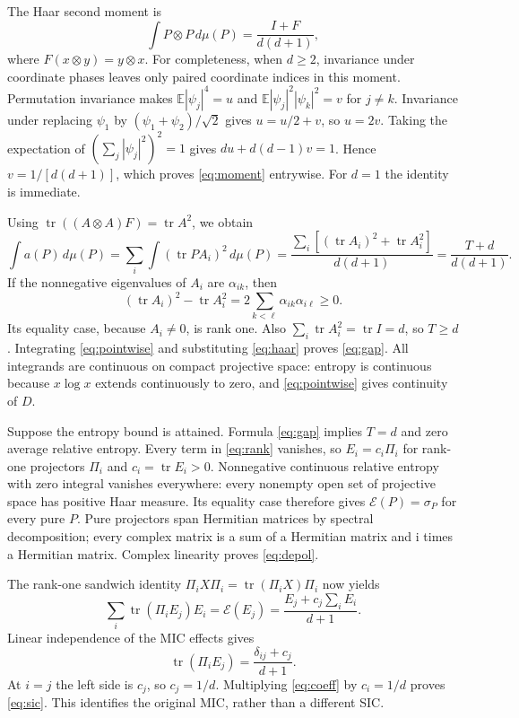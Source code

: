 \documentclass[11pt]{article}
\newcommand{\tr}{\operatorname{tr}}
\newcommand{\Id}{I}
\newcommand{\cE}{\mathcal E}
\begin{document}
The Haar second moment is
\begin{equation}\label{eq:moment}
 \int P\otimes P\,d\mu(P)=\frac{\Id+F}{d(d+1)},
\end{equation}
where $F(x\otimes y)=y\otimes x$.
For completeness, when $d\geq2$, invariance under coordinate phases
leaves only paired coordinate indices in this moment. Permutation
invariance makes $\mathbb E|\psi_j|^4=u$ and
$\mathbb E|\psi_j|^2|\psi_k|^2=v$ for $j\ne k$.
Invariance under replacing $\psi_1$ by $(\psi_1+\psi_2)/\sqrt2$
gives $u=u/2+v$, so $u=2v$. Taking the expectation of
$(\sum_j|\psi_j|^2)^2=1$ gives $du+d(d-1)v=1$.
Hence $v=1/[d(d+1)]$, which proves \eqref{eq:moment} entrywise.
For $d=1$ the identity is immediate.

Using $\tr((A\otimes A)F)=\tr A^2$, we obtain
\begin{equation}\label{eq:haar}
 \int a(P)\,d\mu(P)
 =\sum_i\int(\tr PA_i)^2\,d\mu(P)
 =\frac{\sum_i[(\tr A_i)^2+\tr A_i^2]}{d(d+1)}
 =\frac{T+d}{d(d+1)}.
\end{equation}
If the nonnegative eigenvalues of $A_i$ are $\alpha_{ik}$, then
\begin{equation}\label{eq:rank}
 (\tr A_i)^2-\tr A_i^2
   =2\sum_{k<\ell}\alpha_{ik}\alpha_{i\ell}\geq0.
\end{equation}
Its equality case, because $A_i\ne0$, is rank one.
Also $\sum_i\tr A_i^2=\tr\Id=d$, so $T\geq d$.
Integrating \eqref{eq:pointwise} and substituting \eqref{eq:haar}
proves \eqref{eq:gap}. All integrands are continuous on compact
projective space: entropy is continuous because $x\log x$ extends
continuously to zero, and \eqref{eq:pointwise} gives continuity of $D$.

Suppose the entropy bound is attained. Formula \eqref{eq:gap} implies
$T=d$ and zero average relative entropy. Every term in
\eqref{eq:rank} vanishes, so $E_i=c_i\Pi_i$ for rank-one projectors
$\Pi_i$ and $c_i=\tr E_i>0$. Nonnegative continuous relative entropy
with zero integral vanishes everywhere: every nonempty open set of
projective space has positive Haar measure. Its equality case therefore
gives $\cE(P)=\sigma_P$ for every pure $P$.
Pure projectors span Hermitian matrices by spectral decomposition;
every complex matrix is a sum of a Hermitian matrix and $\mathrm i$
times a Hermitian matrix. Complex linearity proves \eqref{eq:depol}.

The rank-one sandwich identity
$\Pi_iX\Pi_i=\tr(\Pi_iX)\Pi_i$ now yields
\[
 \sum_i\tr(\Pi_iE_j)E_i
 =\cE(E_j)=\frac{E_j+c_j\sum_i E_i}{d+1}.
\]
Linear independence of the MIC effects gives
\begin{equation}\label{eq:coeff}
 \tr(\Pi_iE_j)=\frac{\delta_{ij}+c_j}{d+1}.
\end{equation}
At $i=j$ the left side is $c_j$, so $c_j=1/d$.
Multiplying \eqref{eq:coeff} by $c_i=1/d$ proves \eqref{eq:sic}.
This identifies the original MIC, rather than a different SIC.
\end{document}
